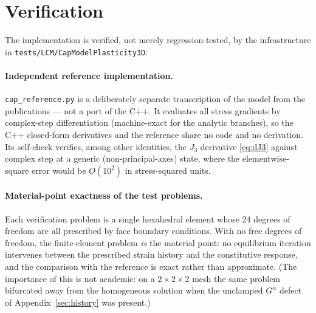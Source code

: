 \documentclass[12pt]{article}
\begin{document}
\section{Verification}
\label{sec:verification}

The implementation is verified, not merely regression-tested, by the
infrastructure in \texttt{tests/LCM/CapModelPlasticity3D}:

\paragraph{Independent reference implementation.}
\texttt{cap\_reference.py} is a deliberately separate transcription
of the model from the publications --- not a port of the C++. It
evaluates all stress gradients by complex-step differentiation
(machine-exact for the analytic branches), so the C++ closed-form
derivatives and the reference share no code and no derivation. Its
self-check verifies, among other identities, the $J_3$ derivative
\eqref{eq:dJ3} against complex step at a generic (non-principal-axes)
state, where the elementwise-square error would be $O(10^2)$ in
stress-squared units.

\paragraph{Material-point exactness of the test problems.}
Each verification problem is a single hexahedral element whose 24
degrees of freedom are all prescribed by face boundary conditions.
With no free degrees of freedom, the finite-element problem \emph{is}
the material point: no equilibrium iteration intervenes between the
prescribed strain history and the constitutive response, and the
comparison with the reference is exact rather than approximate. (The
importance of this is not academic: on a $2\times2\times2$ mesh the
same problem bifurcated away from the homogeneous solution when the
unclamped $G^\alpha$ defect of Appendix~\ref{sec:history} was
present.)
\end{document}
